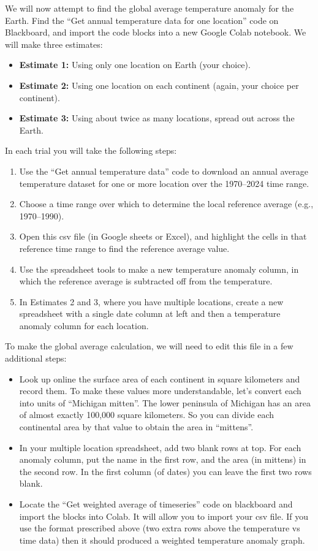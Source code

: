We will now attempt to find the global average temperature anomaly for the Earth.   Find the ``Get annual temperature data for one location'' code on Blackboard, and import the code blocks into a new Google Colab notebook.  We will make three estimates:
	\begin{itemize}
	\item {\bf Estimate 1:} Using only one location on Earth (your choice).
	\item {\bf Estimate 2:} Using one location on each continent (again, your choice per continent).
	\item {\bf Estimate 3:} Using about twice as many locations, spread out across the Earth.
	\end{itemize}
In each trial you will take the following steps:
	\begin{enumerate}
	\item Use the ``Get annual temperature data'' code to download an annual average temperature dataset for one or more location over the 1970--2024 time range.
	\item Choose a time range over which to determine the local reference average (e.g., 1970--1990).
	\item Open this csv file (in Google sheets or Excel), and highlight the cells in that reference time range to find the reference average value.
	\item Use the spreadsheet tools to make a new temperature anomaly column, in which the reference average is subtracted off from the temperature.
	\item In Estimates 2 and 3, where you have multiple locations, create a new spreadsheet with a single date column at left and then a temperature anomaly column for each location.
	\end{enumerate}
To make the global average calculation, we will need to edit this file in a few additional steps:
	\begin{itemize}
	\item Look up online the surface area of each continent in square kilometers and record them.  To make these values more understandable, let's convert each into units of ``Michigan mitten''. The lower peninsula of Michigan has an area of almost exactly 100,000 square kilometers.  So you can divide each continental area by that value to obtain the area in ``mittens''.  
	\item In your multiple location spreadsheet, add two blank rows at top.  For each anomaly column, put the name in the first row, and the area (in mittens) in the second row.  In the first column (of dates) you can leave the first two rows blank.
	\item Locate the ``Get weighted average of timeseries'' code on blackboard and import the blocks into Colab.  It will allow you to import your csv file. If you use the format prescribed above (two extra rows above the temperature vs time data) then it should produced a weighted temperature anomaly graph.
	\end{itemize}





 